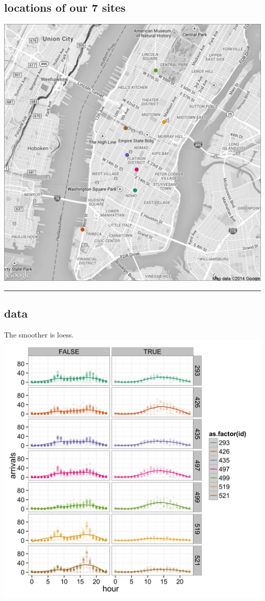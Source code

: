 \documentclass[]{article}
\begin{document}
\subsection{locations of our 7 sites}\label{locations-of-our-7-sites}

\includegraphics{../fig/map_top7.png}

\begin{center}\rule{0.5\linewidth}{\linethickness}\end{center}

\subsection{data}\label{data}

The smoother is loess. \includegraphics{../fig/top7_average_day.png}
\end{document}
